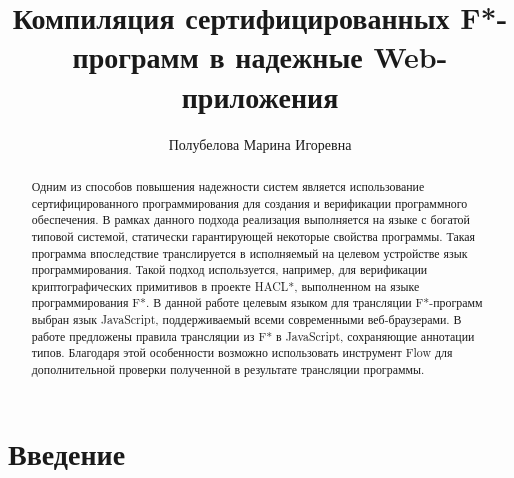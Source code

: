 \title{Компиляция сертифицированных F*-программ в надежные Web-приложения}


\author{Полубелова Марина Игоревна}



\maketitle

\begin{abstract}
Одним из способов повышения надежности систем является использование
сертифицированного программирования для создания и верификации программного
обеспечения. В рамках данного подхода реализация выполняется на языке с богатой
типовой системой, статически гарантирующей некоторые свойства программы. Такая
программа впоследствие транслируется в исполняемый на целевом устройстве язык
программирования. Такой подход используется, например, для верификации
криптографических примитивов в проекте HACL*, выполненном на языке
программирования F*. В данной работе целевым языком для трансляции F*-программ
выбран язык JavaScript, поддерживаемый всеми современными веб-браузерами. В
работе предложены правила трансляции из F* в JavaScript, сохраняющие аннотации
типов. Благодаря этой особенности возможно использовать инструмент Flow для
дополнительной проверки полученной в результате трансляции программы.
\end{abstract}



 

\section*{Введение}

